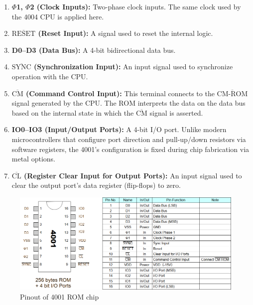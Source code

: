 \begin{enumerate}[\textbf{(\arabic*)}]
  \item \textbf{$\Phi$1, $\Phi$2 (Clock Inputs):}  
    Two-phase clock inputs. The same clock used by the 4004 CPU is applied here.

  \item \textbf{$\overline{\text{RESET}}$ (Reset Input):}  
    A signal used to reset the internal logic.

  \item \textbf{D0--D3 (Data Bus):}  
    A 4-bit bidirectional data bus.

  \item \textbf{$\overline{\text{SYNC}}$ (Synchronization Input):}  
    An input signal used to synchronize operation with the CPU.

  \item \textbf{$\overline{\text{CM}}$ (Command Control Input):}  
    This terminal connects to the $\overline{\text{CM-ROM}}$ signal generated by the CPU. The ROM interprets the data on the data bus based on the internal state in which the $\overline{\text{CM}}$ signal is asserted.

  \item \textbf{IO0--IO3 (Input/Output Ports):}  
    A 4-bit I/O port. Unlike modern microcontrollers that configure port direction and pull-up/down resistors via software registers, the 4001's configuration is fixed during chip fabrication via metal options.

  \item \textbf{$\overline{\text{CL}}$ (Register Clear Input for Output Ports):}  
    An input signal used to clear the output port's data register (flip-flops) to zero.
\end{enumerate}

\begin{figure}
    \includegraphics[width=1.0\columnwidth]{./Figure/Pinout4001.png}
    \caption{Pinout of 4001 ROM chip}
    \label{fig:PINOUT4001}
\end{figure}

